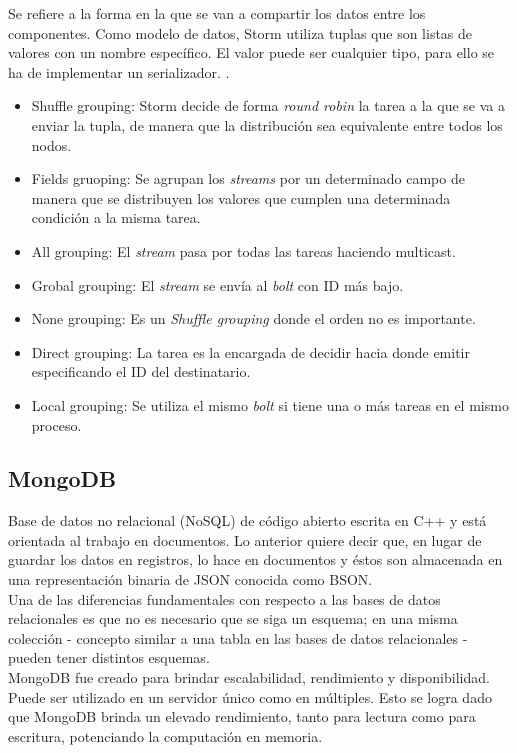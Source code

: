 	Se refiere a la forma en la que se van a compartir los datos entre los componentes. Como modelo de datos, Storm utiliza tuplas que son listas de valores con un nombre específico. El valor puede ser cualquier tipo, para ello se ha de implementar un serializador. \cite{Storm}.\\

	\begin{itemize}
	\item Shuffle grouping: Storm decide de forma \textit{round robin} la tarea a la que se va a enviar la tupla, de manera que la distribución sea equivalente entre todos los nodos.
	\item Fields gruoping: Se agrupan los \textit{streams} por un determinado campo de manera que se distribuyen los valores que cumplen una determinada condición a la misma tarea.
	\item All grouping: El \textit{stream} pasa por todas las tareas haciendo multicast.
	\item Grobal grouping: El \textit{stream} se envía al \textit{bolt} con ID más bajo.
	\item None grouping: Es un \textit{Shuffle grouping} donde el orden no es importante.
	\item Direct grouping: La tarea es la encargada de decidir hacia donde emitir especificando el ID del destinatario.
	\item Local grouping: Se utiliza el mismo \textit{bolt} si tiene una o más tareas en el mismo proceso.
	\end{itemize}

	\subsection{MongoDB}

	Base de datos no relacional (NoSQL) de código abierto escrita en C++ y está orientada al trabajo en documentos. Lo anterior quiere decir que, en lugar de guardar los datos en registros, lo hace en documentos y éstos son almacenada en una representación binaria de JSON conocida como BSON.\\

	Una de las diferencias fundamentales con respecto a las bases de datos relacionales es que no es necesario que se siga un esquema; en una misma colección - concepto similar a una tabla en las bases de datos relacionales - pueden tener distintos esquemas.\\

	MongoDB fue creado para brindar escalabilidad, rendimiento y disponibilidad. Puede ser utilizado en un servidor único como en múltiples. Esto se logra dado que MongoDB brinda un elevado rendimiento, tanto para lectura como para escritura, potenciando la computación en memoria.\\

